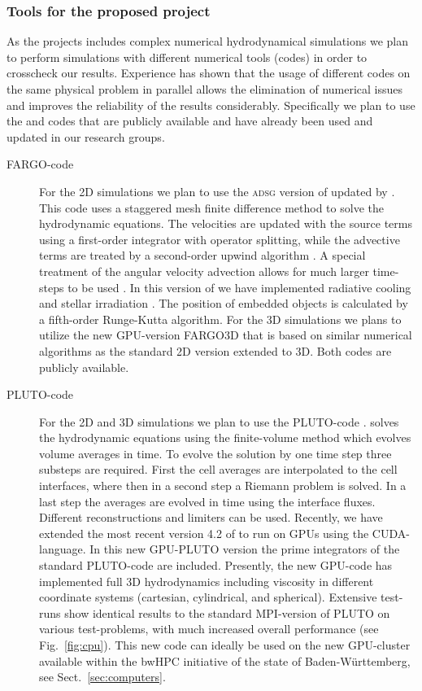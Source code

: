 \documentclass[10pt,fleqn,twoside]{article}
\begin{document}
\subsubsection{Tools for the proposed project}
\label{subsec:tools}
As the projects includes complex numerical hydrodynamical simulations we plan to
perform simulations with different numerical tools (codes) in order to crosscheck
our results. Experience has shown that the usage of different codes on the same
physical problem in parallel allows the elimination of numerical issues and improves the reliability
of the results considerably. 
Specifically we plan to use the  and  codes
that are publicly available and have already been used and updated in our research groups.
\begin{description}
\item[FARGO-code]
For the 2D simulations we plan to use the \textsc{adsg} version of  
\citep{2000A&AS..141..165M,2008ApJ...672.1054B} updated by \cite{2012A&A...539A..18M}.
This code uses a staggered mesh finite difference method to solve the hydrodynamic equations.
The velocities are updated with the source terms using a first-order integrator with operator splitting,
while the advective terms are treated by a second-order upwind algorithm \citep{1977JCoPh..23..276V}.
A special treatment of the angular velocity advection allows for much larger time-steps to be used
\citep{2000A&AS..141..165M}. In this version of   we have implemented radiative cooling and
stellar irradiation \citep{2012A&A...539A..18M}.
The position of embedded objects is calculated by a fifth-order Runge-Kutta algorithm.
For the 3D simulations we plans to utilize the new GPU-version FARGO3D \citep{2016ApJS..223...11B}
that is based on similar numerical algorithms as the standard 2D version extended to 3D.
Both codes are publicly available.

\item[PLUTO-code]
For the 2D and 3D simulations we plan to use the PLUTO-code \citep{2007ApJS..170..228M}.
 solves the hydrodynamic equations
using the finite-volume method which evolves volume averages in time. To evolve
the solution by one time step three substeps are required. First the cell
averages are interpolated to the cell interfaces, where then in a second step a
Riemann problem is solved. In a last step the averages are evolved in time using
the interface fluxes. Different reconstructions and limiters can be used.
Recently, we have extended the most recent version 4.2 of  to run on GPUs
using the CUDA-language. In this new GPU-PLUTO version
the prime integrators of the standard PLUTO-code are included. Presently, the new
GPU-code has implemented full 3D hydrodynamics including viscosity in different coordinate systems   
(cartesian, cylindrical, and spherical). 
Extensive test-runs show identical results to the standard MPI-version of PLUTO
on various test-problems, with much increased overall performance (see Fig.~\ref{fig:cpu}).
This new code can ideally be used on the new GPU-cluster available
within the bwHPC initiative of the state of Baden-W\"urttemberg, see Sect.~\ref{sec:computers}. 


\end{description}
\end{document}
